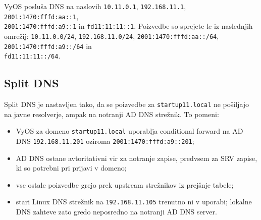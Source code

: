 \documentclass[a4paper,11pt]{article}
\begin{document}
VyOS posluša DNS na naslovih \texttt{10.11.0.1}, \texttt{192.168.11.1}, \texttt{2001:1470:fffd:aa::1}, \\
\texttt{2001:1470:fffd:a9::1} in \texttt{fd11:11:11::1}. 
Poizvedbe so sprejete le iz naslednjih omrežij: \texttt{10.11.0.0/24}, \texttt{192.168.11.0/24}, \texttt{2001:1470:fffd:aa::/64}, \texttt{2001:1470:fffd:a9::/64} in\\ \texttt{fd11:11:11::/64}. 

\subsection{Split DNS}
Split DNS je nastavljen tako, da se poizvedbe za \texttt{startup11.local} ne pošiljajo na javne resolverje, ampak na notranji AD DNS strežnik. To pomeni:
\begin{itemize}
  \item VyOS za domeno \texttt{startup11.local} uporablja conditional forward na AD DNS \texttt{192.168.11.201} oziroma \texttt{2001:1470:fffd:a9::201};
  \item AD DNS ostane avtoritativni vir za notranje zapise, predvsem za SRV zapise, ki so potrebni pri prijavi v domeno;
  \item vse ostale poizvedbe grejo prek upstream strežnikov iz prejšnje tabele;
  \item stari Linux DNS strežnik na \texttt{192.168.11.105} trenutno ni v uporabi; lokalne DNS zahteve zato gredo neposredno na notranji AD DNS server.
\end{itemize}
\end{document}
